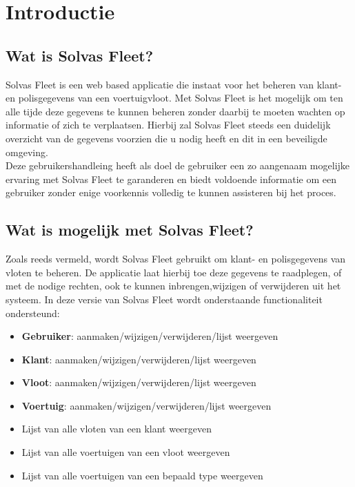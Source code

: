 \documentclass[11pt,openany]{article}
\begin{document}


	
	\tableofcontents
	\newpage
	
\section{Introductie}

\subsection{Wat is Solvas Fleet?}
Solvas Fleet is een web based applicatie die instaat voor het beheren van klant- en polisgegevens van een voertuigvloot. Met Solvas Fleet is het mogelijk om ten alle tijde deze gegevens te kunnen beheren zonder daarbij te moeten wachten op informatie of zich te verplaatsen.  Hierbij zal Solvas Fleet steeds een duidelijk overzicht van de gegevens voorzien die u nodig heeft en dit in een beveiligde omgeving.\\

Deze gebruikershandleing heeft als doel de gebruiker een zo aangenaam mogelijke ervaring met Solvas Fleet te garanderen en biedt voldoende informatie om een gebruiker zonder enige voorkennis volledig te kunnen assisteren bij het proces.
\subsection{Wat is mogelijk met Solvas Fleet?}
Zoals reeds vermeld, wordt Solvas Fleet gebruikt om klant- en polisgegevens van vloten te beheren. De applicatie laat hierbij toe deze gegevens te raadplegen, of met de nodige rechten, ook te kunnen inbrengen,wijzigen of verwijderen uit het systeem. In deze versie van Solvas Fleet wordt onderstaande functionaliteit ondersteund:


\begin{itemize}[noitemsep]
	\item \textbf{Gebruiker}: aanmaken/wijzigen/verwijderen/lijst weergeven
	\item \textbf{Klant}: aanmaken/wijzigen/verwijderen/lijst weergeven
	\item \textbf{Vloot}: aanmaken/wijzigen/verwijderen/lijst weergeven
	\item \textbf{Voertuig}: aanmaken/wijzigen/verwijderen/lijst weergeven
	\item Lijst van alle vloten van een klant weergeven
	\item Lijst van alle voertuigen van een vloot weergeven
	\item Lijst van alle voertuigen van een bepaald type weergeven
\end{itemize}
\end{document}
